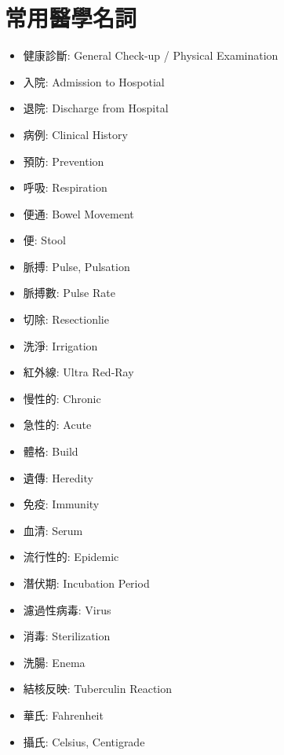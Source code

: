 \section{常用醫學名詞}
\begin{multicols}{3}
\begin{itemize}
  \itemsep0em
  \item 健康診斷: General Check-up / Physical Examination
  \item 入院: Admission to Hospotial
  \item 退院: Discharge from Hospital
  \item 病例: Clinical History
  \item 預防: Prevention
  \item 呼吸: Respiration
  \item 便通: Bowel Movement
  \item 便: Stool
  \item 脈搏: Pulse, Pulsation
  \item 脈搏數: Pulse Rate
  \item 切除: Resectionlie
  \item 洗淨: Irrigation
  \item 紅外線: Ultra Red-Ray
  \item 慢性的: Chronic
  \item 急性的: Acute
  \item 體格: Build
  \item 遺傳: Heredity
  \item 免疫: Immunity
  \item 血清: Serum
  \item 流行性的: Epidemic
  \item 潛伏期: Incubation Period
  \item 濾過性病毒: Virus
  \item 消毒: Sterilization
  \item 洗腸: Enema
  \item 結核反映: Tuberculin Reaction
  \item 華氏: Fahrenheit
  \item 攝氏: Celsius, Centigrade
\end{itemize}
\end{multicols}

